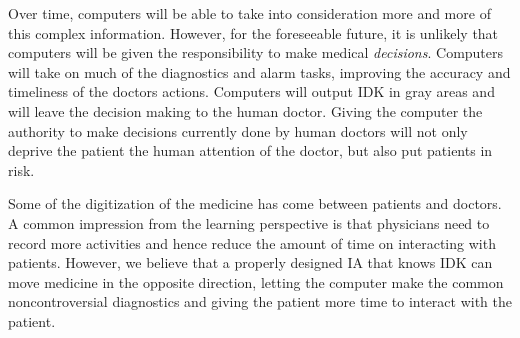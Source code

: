 \documentclass[11pt]{pnas-new}
\begin{document}
  Over time, computers will be able to take into consideration more
  and more of this complex information. However, for the foreseeable
  future, it is unlikely that computers will be given the
  responsibility to make medical {\em decisions}. Computers
  will take on much of the diagnostics and alarm tasks, improving the
  accuracy and timeliness of the doctors actions. Computers will
  output IDK in gray areas and will leave the decision making to the
  human doctor. Giving the computer the authority to make decisions
  currently done by human doctors will {\color{blue}not only} deprive the patient the human
  attention of the doctor{\color{blue}, but also put patients in risk}.

  Some of the digitization of the medicine has come between patients
  and doctors. {\color{blue}A common impression from the learning perspective is that physicians need to record more activities and hence reduce the amount of time on interacting with patients. However, we} %
  believe that {\color{blue}a properly designed } IA {\color{blue}that knows IDK} can
  move medicine in the opposite direction, letting the computer make
  the common noncontroversial diagnostics and giving the patient more
  time to interact with the patient.

\end{document}
